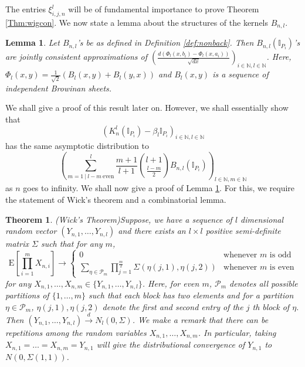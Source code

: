 \documentclass[reqno,12pt]{amsart}
\theoremstyle{plain}
\newtheorem{theorem}{Theorem}
\newtheorem{lemma}{Lemma}
\theoremstyle{definition}
\begin{document}
The entries $\xi_{i,j,n}^{l}$ will be of fundamental importance to prove Theorem \ref{Thm:wigcon}. We now state a lemma about the structures of the kernels $B_{n,l}$. 
\begin{lemma}\label{lem:nonback}
Let $B_{n,l}$'s be as defined in Definition \ref{def:nonback}. Then $B_{n,l}\left(\mathbb{I}_{P_{i}}\right)$'s are jointly consistent approximations of $\left( \frac{d(\Phi_{l}(x,b_{i})-\Phi_{l}(x,a_{i}))}{\sqrt{dx}} \right)_{i \in \mathbb{N},l\in \mathbb{N}}$. Here, $\Phi_l(x,y)= \frac{1}{\sqrt{2}}\left(B_{l}(x,y)+ B_{l}(y,x)\right)$ and $B_{l}(x,y)$ is a sequence of independent Browinan sheets.
\end{lemma}
We shall give a proof of this result later on. However, we shall essentially show that 
\[
\left(K_{n}^{l}(\mathbb{I}_{P_{i}})- \beta_{l}\mathbb{I}_{P_{i}}\right)_{i\in \mathbb{N}, l \in \mathbb{N}}
\]
has the same asymptotic distribution to 
\[
\left(\sum_{m=1~|~ l-m ~ \text{even}}^{l} \frac{m+1}{l+1}\binom{l+1}{\frac{l-m}{2}} B_{n,l}\left(\mathbb{I}_{P_{i}}\right)\right)_{l\in \mathbb{N}, m \in \mathbb{N}}
\]
as $n$ goes to infinity.
We shall now give a proof of Lemma \ref{lem:nonback}. For this, we require the statement of Wick's theorem and a combinatorial lemma. 
\begin{theorem}(Wick's Theorem)\label{Thm:wick}
    Suppose, we have a sequence of $l$ dimensional random vector $\left(Y_{n,1},\ldots, Y_{n,l}\right)$ and there exists an $l \times l$ positive semi-definite matrix $\Sigma$ such that for any $m$, 
    \[
      \mathrm{E}\left[ \prod_{i=1}^{m} X_{n,i} \right] \to \left\{
         \begin{array}{cc}
             0 & \text{whenever $m$ is odd} \\
             \sum_{\eta \in \mathcal{P}_{m}} \prod_{j=1}^{\frac{m}{2}} \Sigma\left(\eta(j,1),\eta(j,2)\right) & \text{whenever $m$ is even} 
         \end{array}
      \right.
    \]
    for any $X_{n,1},\ldots, X_{n,m} \in \{ Y_{n,1},\ldots, Y_{n,l} \}$. Here, for even $m$, $\mathcal{P}_{m}$ denotes all possible partitions of $\{ 1,\ldots,m \}$ such that each block has two elements and for a partition $\eta \in \mathcal{P}_{m}$, $\eta(j,1),\eta(j,2)$ denote the first and second entry of the $j$ th block of $\eta$. Then $(Y_{n,1},\ldots, Y_{n,l}) \stackrel{d}{\to} N_{l}\left( 0, \Sigma \right)$. We make a remark that there can be repetitions among the random variables $X_{n,1},\ldots, X_{n,m}$. In particular, taking $X_{n,1}=\ldots= X_{n,m}=Y_{n,1}$ will give the distributional convergence of $Y_{n,1}$ to $N(0, \Sigma(1,1))$. 
\end{theorem}
\end{document}
